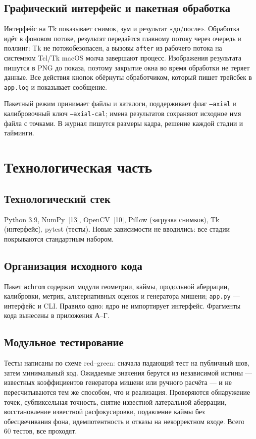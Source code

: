 \documentclass[a4paper,14pt,oneside]{extreport}
\begin{document}
\subsection{Графический интерфейс и пакетная обработка}

Интерфейс на Tk показывает снимок, зум и результат «до/после». Обработка
идёт в фоновом потоке, результат передаётся главному потоку через очередь и
поллинг: Tk не потокобезопасен, а вызовы \texttt{after} из рабочего потока
на системном Tcl/Tk macOS молча завершают процесс. Изображения результата
пишутся в PNG до показа, поэтому закрытие окна во время обработки не теряет
данные. Все действия кнопок обёрнуты обработчиком, который пишет трейсбек в
\texttt{app.log} и показывает сообщение.

Пакетный режим принимает файлы и каталоги, поддерживает флаг
\texttt{--axial} и калибровочный ключ \texttt{--axial-cal}; имена результатов
сохраняют исходное имя файла с точками. В журнал пишутся размеры кадра,
решение каждой стадии и тайминги.

\section{Технологическая часть}

\subsection{Технологический стек}

Python 3.9, NumPy~[13], OpenCV~[10], Pillow (загрузка снимков), Tk
(интерфейс), pytest (тесты). Новые зависимости не вводились: все стадии
покрываются стандартным набором.

\subsection{Организация исходного кода}

Пакет \texttt{achrom} содержит модули геометрии, каймы, продольной
аберрации, калибровки, метрик, альтернативных оценок и генератора мишени;
\texttt{app.py} --- интерфейс и CLI. Правило одно: ядро не импортирует
интерфейс. Фрагменты кода вынесены в приложения А--Г.

\subsection{Модульное тестирование}

Тесты написаны по схеме red--green: сначала падающий тест на публичный шов,
затем минимальный код. Ожидаемые значения берутся из независимой истины ---
известных коэффициентов генератора мишени или ручного расчёта --- и не
пересчитываются тем же способом, что и реализация. Проверяются обнаружение
точек, субпиксельная точность, снятие известной латеральной аберрации,
восстановление известной расфокусировки, подавление каймы без обесцвечивания
фона, идемпотентность и отказы на некорректном входе. Всего 60 тестов, все
проходят.
\end{document}
